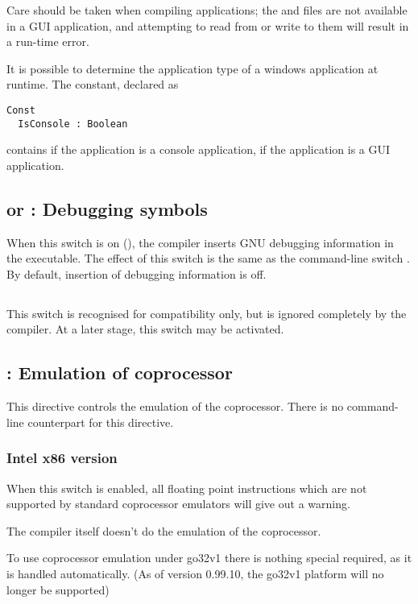 \documentclass{report}
\begin{document}
Care should be taken when compiling  applications; the 
and  files are not available in a GUI application, and
attempting to read from or write to them will result in a run-time error.

It is possible to determine the application type of a windows application
at runtime. The  constant, declared as
\begin{verbatim}
Const
  IsConsole : Boolean 
\end{verbatim}
contains  if the application is a console application, 
if the application is a GUI application.

\subsection{ or : Debugging symbols}

When this switch is on (),
the compiler inserts GNU debugging information in
the executable. The effect of this switch is the same as the command-line
switch . By default, insertion of debugging information is off.

\subsection{}

This switch is recognised for compatibility only, but is ignored completely
by the compiler. At a later stage, this switch may be activated.

\subsection{ : Emulation of coprocessor}

This directive controls the emulation of the coprocessor. There is no
command-line counterpart for this directive.

\subsubsection{ Intel x86 version }

When this switch is enabled, all floating point instructions
which are not supported by standard coprocessor emulators will give out
a warning.

The compiler itself doesn't do the emulation of the coprocessor.

To use coprocessor emulation under \dos go32v1 there is nothing special
required, as it is handled automatically. (As of version 0.99.10, the
go32v1 platform will no longer be supported)
\end{document}
